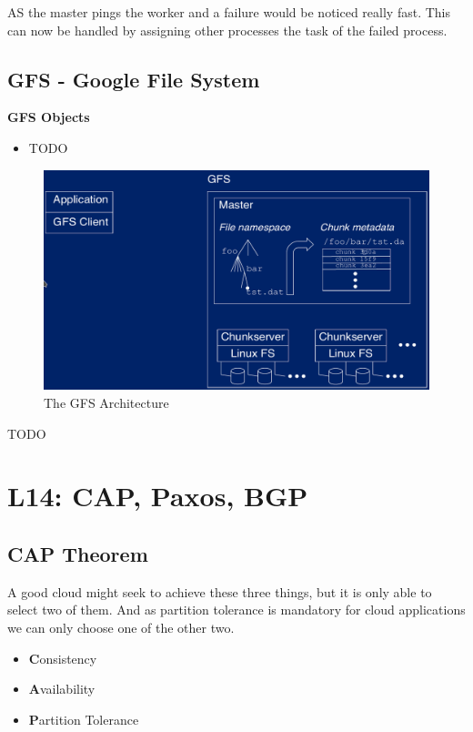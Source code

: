 \documentclass[a4paper]{article}
\begin{document}
\begin{multicols}{3}
AS the master pings the worker and a failure would be noticed really fast. This can now be handled by assigning other processes the task 
of the failed process.

\subsection{GFS - Google File System}
\textbf{GFS Objects}
\begin{itemize}
    \item TODO 
\end{itemize}

\begin{figure}[H]
    \includegraphics[width=\linewidth]{GFSArchitecture.png}
    \caption{The GFS Architecture}
    \label{fig:gfs}
\end{figure}

TODO

\section{L14: CAP, Paxos, BGP}

\subsection{CAP Theorem}
A good cloud might seek to achieve these three things, but it is only able to select two of them.
And as partition tolerance is mandatory for cloud applications we can only choose one of the other two.

\begin{itemize}
    \item \textbf{C}onsistency
    \item \textbf{A}vailability
    \item \textbf{P}artition Tolerance
\end{itemize}


\end{multicols}
\end{document}
